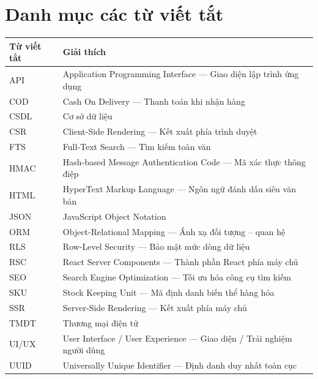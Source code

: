 \chapter*{Danh mục các từ viết tắt}

\renewcommand{\arraystretch}{1.4}
\noindent
\begin{tabularx}{\linewidth}{|p{2.4cm}|X|}
\hline
\textbf{Từ viết tắt} & \textbf{Giải thích} \\ \hline
API & Application Programming Interface --- Giao diện lập trình ứng dụng \\ \hline
COD & Cash On Delivery --- Thanh toán khi nhận hàng \\ \hline
CSDL & Cơ sở dữ liệu \\ \hline
CSR & Client-Side Rendering --- Kết xuất phía trình duyệt \\ \hline
FTS & Full-Text Search --- Tìm kiếm toàn văn \\ \hline
HMAC & Hash-based Message Authentication Code --- Mã xác thực thông điệp \\ \hline
HTML & HyperText Markup Language --- Ngôn ngữ đánh dấu siêu văn bản \\ \hline
JSON & JavaScript Object Notation \\ \hline
ORM & Object-Relational Mapping --- Ánh xạ đối tượng -- quan hệ \\ \hline
RLS & Row-Level Security --- Bảo mật mức dòng dữ liệu \\ \hline
RSC & React Server Components --- Thành phần React phía máy chủ \\ \hline
SEO & Search Engine Optimization --- Tối ưu hóa công cụ tìm kiếm \\ \hline
SKU & Stock Keeping Unit --- Mã định danh biến thể hàng hóa \\ \hline
SSR & Server-Side Rendering --- Kết xuất phía máy chủ \\ \hline
TMĐT & Thương mại điện tử \\ \hline
UI/UX & User Interface / User Experience --- Giao diện / Trải nghiệm người dùng \\ \hline
UUID & Universally Unique Identifier --- Định danh duy nhất toàn cục \\ \hline
\end{tabularx}
\renewcommand{\arraystretch}{1}

